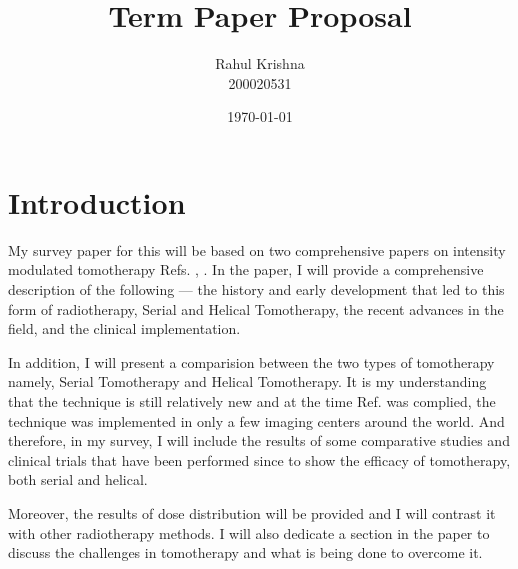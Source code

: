 \documentclass[12pt]{article}
\title{Term Paper Proposal}
\author{Rahul Krishna \\ 200020531}
\date{\today}
\begin{document}
\maketitle
\section* {Introduction}
My survey paper for this will be based on two comprehensive papers on intensity modulated tomotherapy Refs. \cite{IMRT2001}, \cite{Mackie2006}. In the paper, I will provide a comprehensive description of the following --- the history and early development that led to this form of radiotherapy, Serial and Helical Tomotherapy, the recent advances in the field, and the clinical implementation. 

In addition, I will present a comparision between the two types of tomotherapy namely, Serial Tomotherapy and Helical Tomotherapy. It is my understanding that the technique is still relatively new and at the time Ref. \cite{IMRT2001} was complied, the technique was implemented in only a few imaging centers around the world. And therefore, in my survey, I will include the results of some comparative studies and clinical trials that have been performed since to show the efficacy of tomotherapy, both serial and helical.

Moreover, the results of dose distribution will be provided and I will  contrast it with other radiotherapy methods. I will also dedicate a section in the paper to discuss the challenges in tomotherapy and what is being done to overcome it.
{}

\end{document}
